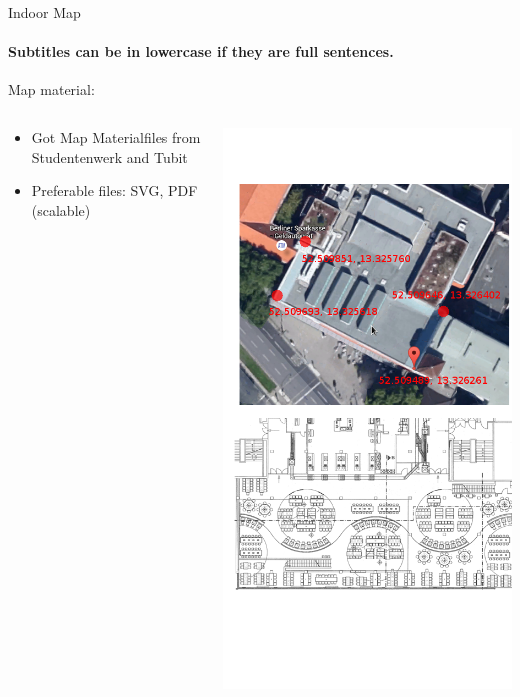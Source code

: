 \documentclass[11pt]{beamer}
\begin{document}
\begin{frame}{Indoor Map}

\framesubtitle{Subtitles can be in lowercase if they are full sentences.}
Map material:

  \begin{columns}[T]
  \begin{column}{.6\textwidth}
  \begin{itemize}
    \item Got Map Materialfiles from Studentenwerk and Tubit
    \item Preferable files: SVG, PDF (scalable)
  \end{itemize}
  \end{column}
  \begin{column}{.4\textwidth}
  \includegraphics[scale=0.25]{mensaplan}
  \end{column}
\end{columns}

\end{frame}
\end{document}
